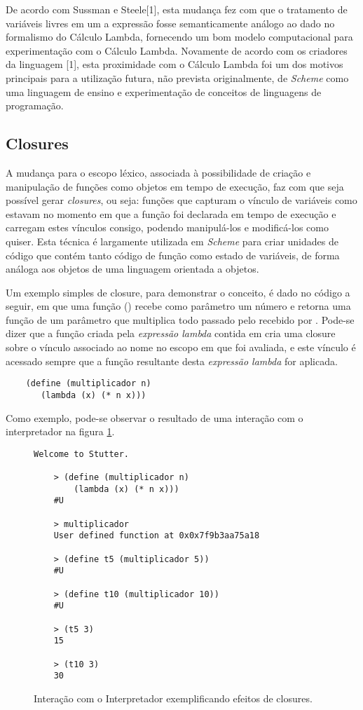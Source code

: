 De acordo com Sussman e Steele[1], esta mudança fez com que o tratamento de
variáveis livres em um a expressão fosse semanticamente análogo ao dado no
formalismo do Cálculo Lambda, fornecendo um bom modelo computacional para
experimentação com o Cálculo Lambda. Novamente de acordo com os criadores da
linguagem [1], esta proximidade com o Cálculo Lambda foi um dos motivos
principais para a utilização futura, não prevista originalmente, de
\textit{Scheme} como uma linguagem de ensino e experimentação de conceitos de
linguagens de programação.

\subsection{Closures}

A mudança para o escopo léxico, associada à possibilidade de criação e
manipulação de funções como objetos em tempo de execução, faz com que seja
possível gerar \textit{closures}, ou seja: funções que capturam o vínculo de
variáveis como estavam no momento em que a função foi declarada em tempo de
execução e carregam estes vínculos consigo, podendo manipulá-los e modificá-los
como quiser. Esta técnica é largamente utilizada em \textit{Scheme} para criar
unidades de código que contém tanto código de função como estado de variáveis,
 de forma análoga aos objetos de uma linguagem orientada a objetos.

Um exemplo simples de closure, para demonstrar o conceito, é dado no código a
seguir, em que uma função () recebe como parâmetro um
número  e retorna uma função de um parâmetro  que multiplica
todo  passado pelo  recebido por . Pode-se
dizer que a função criada pela \textit{expressão lambda} contida em
 cria uma closure sobre o vínculo associado ao nome 
no escopo em que foi avaliada, e este vínculo é acessado sempre que a função
resultante desta \textit{expressão lambda} for aplicada.

\begin{lstlisting}
    (define (multiplicador n)
       (lambda (x) (* n x)))
\end{lstlisting}

Como exemplo, pode-se observar o resultado de uma interação com o interpretador
na figura \ref{fig:interacao-closure}.

\begin{figure}[h!]
\begin{lstlisting}[numbers=none] Welcome to Stutter.
    
    > (define (multiplicador n) 
        (lambda (x) (* n x)))
    #U
    
    > multiplicador
    User defined function at 0x0x7f9b3aa75a18
    
    > (define t5 (multiplicador 5))
    #U
    
    > (define t10 (multiplicador 10))
    #U
    
    > (t5 3)
    15
    
    > (t10 3)
    30
\end{lstlisting}
\caption{Interação com o Interpretador exemplificando efeitos de closures.}
\label{fig:interacao-closure}
\end{figure}

